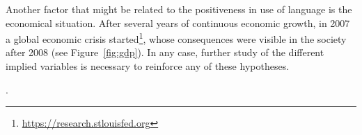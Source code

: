 Another factor that might be related to the positiveness in use of language is the economical situation. After several years of continuous economic growth, in 2007 a global economic crisis started\footnote{\url{https://research.stlouisfed.org}}, whose consequences were visible in the society after 2008 (see Figure~\ref{fig:gdp}). In any case, further study of the different implied variables is necessary to reinforce any of these hypotheses.


. 
    



